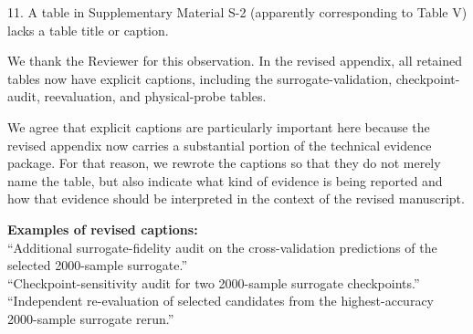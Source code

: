 \begin{ReviewerComment}
11. A table in Supplementary Material S-2 (apparently corresponding to Table V) lacks a table title or caption.
\end{ReviewerComment}
%
\begin{Answer}
We thank the Reviewer for this observation. In the revised appendix, all retained tables now have explicit captions, including the surrogate-validation, checkpoint-audit, reevaluation, and physical-probe tables.

We agree that explicit captions are particularly important here because the revised appendix now carries a substantial portion of the technical evidence package. For that reason, we rewrote the captions so that they do not merely name the table, but also indicate what kind of evidence is being reported and how that evidence should be interpreted in the context of the revised manuscript.
\end{Answer}
\begin{RevisionExcerpt}
\noindent\textbf{Examples of revised captions:}\\
``Additional surrogate-fidelity audit on the cross-validation predictions of the selected 2000-sample surrogate.''\\
``Checkpoint-sensitivity audit for two 2000-sample surrogate checkpoints.''\\
``Independent re-evaluation of selected candidates from the highest-accuracy 2000-sample surrogate rerun.''
\end{RevisionExcerpt}

